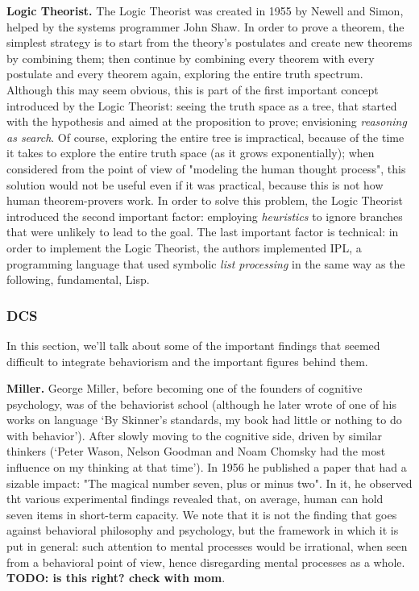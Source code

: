 \documentclass[../main.tex]{subfiles}
\begin{document}
\vspace{4pt}
\textbf{Logic Theorist.} The Logic Theorist was created in 1955 by Newell and Simon, helped by the systems programmer John Shaw. In order to prove a theorem, the simplest strategy is to start from the theory's postulates and create new theorems by combining them; then continue by combining every theorem with every postulate and every theorem again, exploring the entire truth spectrum. Although this may seem obvious, this is part of the first important concept introduced by the Logic Theorist: seeing the truth space as a tree, that started with the hypothesis and aimed at the proposition to prove; envisioning \textit{reasoning as search}. Of course, exploring the entire tree is impractical, because of the time it takes to explore the entire truth space (as it grows exponentially); when considered from the point of view of "modeling the human thought process", this solution would not be useful even if it was practical, because this is not how human theorem-provers work. In order to solve this problem, the Logic Theorist introduced the second important factor: employing \textit{heuristics} to ignore branches that were unlikely to lead to the goal. The last important factor is technical: in order to implement the Logic Theorist, the authors implemented IPL, a programming language that used symbolic \textit{list processing} in the same way as the following, fundamental, Lisp.

\subsubsection{DCS}
In this section, we'll talk about some of the important findings that seemed difficult to integrate behaviorism and the important figures behind them.

\vspace{4pt}
\textbf{Miller.} George Miller, before becoming one of the founders of cognitive psychology, was of the behaviorist school (although he later wrote of one of his works on language \enquote*{By Skinner’s standards, my book had little or nothing to do with behavior}\cite{millerCognitiveRevolutionHistorical2003}). After slowly moving to the cognitive side, driven by similar thinkers (\enquote*{Peter Wason, Nelson Goodman and Noam Chomsky had the most influence on my thinking at that time}). In 1956 he published a paper that had a sizable impact: "The magical number seven, plus or minus two". In it, he observed tht various experimental findings revealed that, on average, human can hold seven items in short-term capacity. We note that it is not the finding that goes against behavioral philosophy and psychology, but the framework in which it is put in general: such attention to mental processes would be irrational, when seen from a behavioral point of view, hence disregarding mental processes as a whole. \textbf{TODO: is this right? check with mom}.
\end{document}
